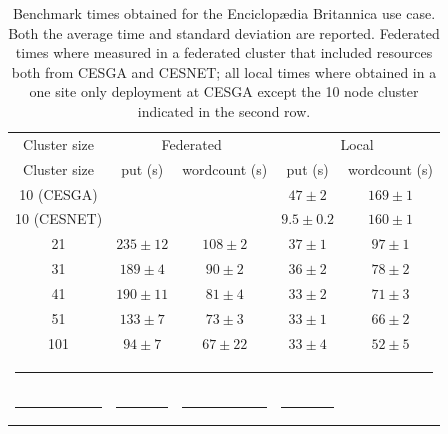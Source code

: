 \documentclass[oribibl]{llncs_Ibergrid2013}
\begin{document}
\begin{table}[h!]
\caption{Benchmark times obtained for the Enciclop{\ae}dia Britannica use case. Both the average time and standard deviation are reported. Federated times where measured in a federated cluster that included resources both from CESGA and CESNET; all local times where obtained in a one site only deployment at CESGA except the 10 node cluster indicated in the second row. }
\label{table:britannica}
%
\vspace{-0.5em}
%
\begin{center}
\begin{tabular}{ccccc}
\toprule
Cluster size				& \multicolumn{2}{c}{Federated} 		& \multicolumn{2}{c}{Local} \\
Cluster size				& put (s)		& wordcount (s) 	& put (s)		& wordcount (s)\\
\midrule
10 (CESGA)             			&        		&               	& $47\pm2$		& $169\pm1$\\
10 (CESNET)          			& 			&  			& $9.5\pm0.2$		& $160\pm1$\\
21                   			& $235\pm12$		& $108\pm2$     	& $37\pm1$		& $97\pm1$\\
31                   			& $189\pm4$		& $90\pm2$      	& $36\pm2$		& $78\pm2$\\
41                   			& $190\pm11$		& $81\pm4$      	& $33\pm2$		& $71\pm3$\\
51                   			& $133\pm7$		& $73\pm3$      	& $33\pm1$		& $66\pm2$\\
101                  			& $94\pm7$		& $67\pm22$      	& $33\pm4$		& $52\pm5$\\
%
\bottomrule
\multicolumn{5}{c}{\rule{0.98\textwidth}{0em}}\\
\rule{0.3\textwidth}{0cm} & \rule{0.2\textwidth}{0cm} & \rule{0.2\textwidth}{0cm} &  \rule{0.2\textwidth}{0cm} & \\
\end{tabular}
\end{center}
\end{table}
\end{document}

